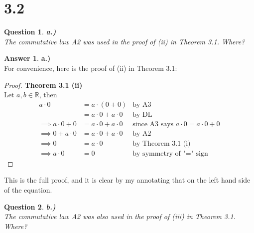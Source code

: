 \documentclass[10pt,a4paper]{article}
\newtheorem*{question*}{Question}
\theoremstyle{definition}
\newtheorem*{answer*}{Answer}
\begin{document}
\section*{3.2}
\begin{question*}{\textbf{a.)}}
\\The commutative law {\normalfont A2} was used in the proof of (ii) in Theorem 3.1. Where?
\end{question*}

\begin{answer*}{\textbf{a.)}}
\\For convenience, here is the proof of (ii) in Theorem 3.1:
\begin{proof}{\textbf{Theorem 3.1 (ii)}}
\\Let $a,b \in \mathbb{R}$, then
\begin{align}
a \cdot 0 &= a \cdot (0 + 0) &\text{by A3}\\
&= a \cdot 0 + a \cdot 0 &\text{by DL}\\
\implies a \cdot 0 + 0 &= a \cdot 0 + a \cdot 0 &\text{since A3 says } a \cdot 0 = a \cdot 0 + 0\\
\implies 0 + a \cdot 0 &= a \cdot 0 + a \cdot 0 &\text{by A2}\\
\implies 0 &= a \cdot 0 &\text{by Theorem 3.1 (i)}\\
\implies a \cdot 0 &= 0 &\text{by symmetry of "=" sign}
\end{align}
\end{proof}
This is the full proof, and it is clear by my annotating that  on the left hand side of the equation. 
\end{answer*}

\begin{question*}{\textbf{b.)}}
\\The commutative law {\normalfont A2} was also used in the proof of (iii) in Theorem 3.1. Where?
\end{question*}
\end{document}
